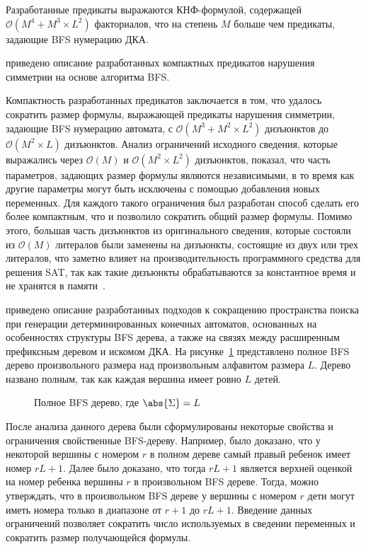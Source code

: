 Разработанные предикаты выражаются КНФ-формулой, содержащей $\mathcal{O}\left(M^{4} + M^{3} \times L^{2}\right)$ факториалов, что на степень $M$ больше чем предикаты, задающие BFS нумерацию ДКА.

\insection{\ref{sec:space:tight}} приведено описание разработанных компактных предикатов нарушения симметрии на основе алгоритма BFS.

Компактность разработанных предикатов заключается в том, что удалось сократить размер формулы, выражающей предикаты нарушения симметрии, задающие BFS нумерацию автомата, с $\mathcal{O}\left(M^{3} + M^{2} \times L^{2}\right)$ дизъюнктов до $\mathcal{O}\left(M^{2} \times L\right)$ дизъюнктов.
Анализ ограничений исходного сведения, которые выражались через $\mathcal{O}\left(M\right)$ и $\mathcal{O}\left(M^{2} \times L^{2}\right)$ дизъюнктов, показал, что часть параметров, задающих размер формулы являются независимыми, в то время как другие параметры могут быть исключены с помощью добавления новых переменных. 
Для каждого такого ограничения был разработан способ сделать его более компактным, что и позволило сократить общий размер формулы.
Помимо этого, б\emph{о}льшая часть дизъюнктов из оригинального сведения, которые состояли из $\mathcal{O}\left(M\right)$ литералов
были заменены на дизъюнкты, состоящие из двух или трех литералов, что заметно влияет на производительность программного средства для решения SAT, так как такие дизъюнкты обрабатываются за константное время и не хранятся в памяти~\cite{MSilva-SATbook09}.

\insection{\ref{sec:space:pruning}} приведено описание разработанных подходов к сокращению пространства поиска при генерации детерминированных конечных автоматов, основанных на особенностях структуры BFS дерева, а также на связях между расширенным префиксным деревом и искомом ДКА.
На рисунке~\ref{syn:img:full-bfs} представлено полное BFS дерево произвольного размера над произвольным алфавитом размера $L$.
Дерево названо полным, так как каждая вершина имеет ровно $L$ детей.

\begin{figure}[ht]
  \begin{center}
    \scalebox{0.625}{}
    \caption{Полное BFS дерево, где $\abs{\Sigma}=L$}
    \label{syn:img:full-bfs}
  \end{center}
\end{figure}

После анализа данного дерева были сформулированы некоторые свойства и ограничения свойственные BFS-дереву.
Например, было доказано, что у некоторой вершины с номером $r$ в полном дереве самый правый ребенок имеет номер $rL + 1$.
Далее было доказано, что тогда $rL + 1$ является верхней оценкой на номер ребенка вершины $r$ в произвольном BFS дереве.
Тогда, можно утверждать, что в произвольном BFS дереве у вершины с номером $r$ дети могут иметь номера только в диапазоне от $r + 1$ до $rL + 1$.
Введение данных ограничений позволяет сократить число используемых в сведении переменных и сократить размер получающейся формулы.

